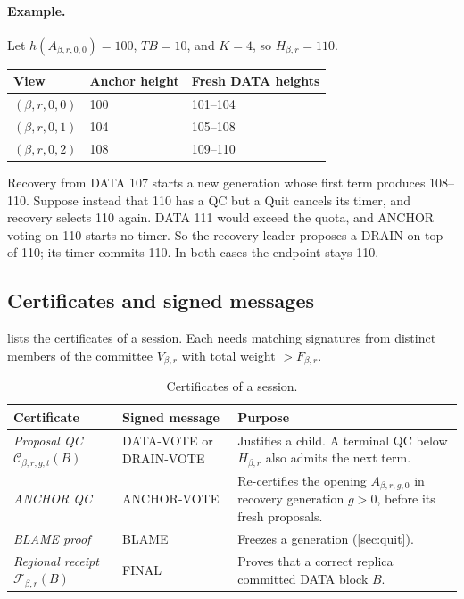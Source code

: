 \documentclass[11pt,a4paper]{article}
\newcommand{\QC}{\mathcal C}
\newcommand{\FC}{\mathcal F}
\newcommand{\TB}{\mathit{TB}}
\newcommand{\defterm}[1]{\textcolor{rrBlue}{\textit{#1}}}
\begin{document}
\paragraph{Example.}
Let $h(A_{\beta,r,0,0})=100$, $\TB=10$, and $K=4$, so $H_{\beta,r}=110$.
\begin{center}\small
\begin{tabular}{@{}lll@{}}\toprule
View & Anchor height & Fresh DATA heights\\\midrule
$(\beta,r,0,0)$ & 100 & 101--104\\
$(\beta,r,0,1)$ & 104 & 105--108\\
$(\beta,r,0,2)$ & 108 & 109--110\\\bottomrule
\end{tabular}
\end{center}
Recovery from DATA 107 starts a new generation whose first term produces
108--110. Suppose instead that 110 has a QC but a Quit cancels its timer,
and recovery selects 110 again. DATA 111 would exceed the quota, and
ANCHOR voting on 110 starts no timer. So the recovery leader proposes a
DRAIN on top of 110; its timer commits 110. In both cases the endpoint
stays 110.

\subsection{Certificates and signed messages}
\label{sec:certificates}
 lists the certificates of a session. Each needs
matching signatures from distinct members of the committee $V_{\beta,r}$
with total weight $>F_{\beta,r}$.

\begin{table}[htbp]\centering\small
\caption{Certificates of a session.}
\label{tab:certificates}
\begin{tabularx}{\linewidth}{@{}>{\raggedright\arraybackslash}p{.25\linewidth}>{\raggedright\arraybackslash}p{.24\linewidth}Y@{}}
\toprule
Certificate & Signed message & Purpose\\
\midrule
\defterm{Proposal QC} $\QC_{\beta,r,g,t}(B)$ & DATA-VOTE or DRAIN-VOTE & Justifies a
child. A terminal QC below $H_{\beta,r}$ also admits the next term.\\
\defterm{ANCHOR QC} & ANCHOR-VOTE & Re-certifies the opening $A_{\beta,r,g,0}$ in
recovery generation $g>0$, before its fresh proposals.\\
\defterm{BLAME proof} & BLAME & Freezes a generation (\cref{sec:quit}).\\
\defterm{Regional receipt} $\FC_{\beta,r}(B)$ & FINAL & Proves that a correct replica
committed DATA block $B$.\\
\bottomrule
\end{tabularx}
\end{table}
\end{document}
